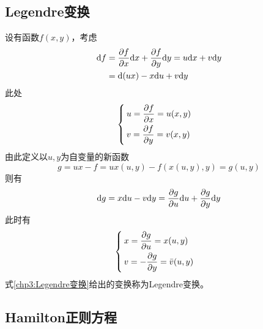 \subsection{Legendre变换}

设有函数$f(x,y)$，考虑
\begin{align*}
	\mathrm{d} f & = \frac{\partial f}{\partial x} \mathrm{d}x + \frac{\partial f}{\partial y} \mathrm{d} y = u\mathrm{d} x + v\mathrm{d} y \\
	& = \mathrm{d} (ux) - x\mathrm{d} u + v\mathrm{d} y
\end{align*}
此处
\begin{equation*}
	\begin{cases}
		\displaystyle u = \frac{\partial f}{\partial x} = u(x,y) \\[1.5ex]
		\displaystyle v = \frac{\partial f}{\partial y} = v(x,y)
	\end{cases}
\end{equation*}
由此定义以$u,y$为自变量的新函数
\begin{equation}
	g = ux - f = ux(u,y) - f(x(u,y),y) = g(u,y)
\end{equation}
则有
\begin{equation*}
	\mathrm{d} g = x\mathrm{d} u - v\mathrm{d}y = \frac{\partial g}{\partial u} \mathrm{d} u + \frac{\partial g}{\partial y} \mathrm{d} y
\end{equation*}
此时有
\begin{equation}
	\begin{cases}
		\displaystyle x = \frac{\partial g}{\partial u} = x(u,y) \\[1.5ex]
		\displaystyle v = - \frac{\partial g}{\partial y} = \bar{v}(u,y)
	\end{cases}
	\label{chp3:Legendre变换}
\end{equation}
式\eqref{chp3:Legendre变换}给出的变换称为{\heiti Legendre变换}。

\subsection{Hamilton正则方程}

